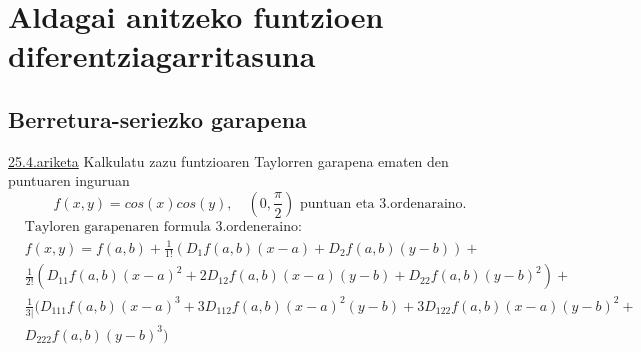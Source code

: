\chapter{Aldagai anitzeko funtzioen diferentziagarritasuna}
\section{Berretura-seriezko garapena}
\underline{25.4.ariketa} Kalkulatu zazu funtzioaren Taylorren garapena ematen den puntuaren inguruan
\begin{equation*}
    f(x,y)=cos(x)cos(y), \quad (0,\frac{\pi}{2}) \text{ puntuan eta 3.ordenaraino.}
\end{equation*}
\begin{equation*}
\begin{split}
    &\text{Tayloren garapenaren formula 3.ordeneraino:}\\
    &f(x,y)=f(a,b)+\frac{1}{1!}(D_1f(a,b)(x-a)+D_2f(a,b)(y-b))+\\
    &\frac{1}{2!}(D_{11}f(a,b)(x-a)^2 +2 D_{12}f(a,b)(x-a)(y-b)+D_{22}f(a,b)(y-b)^2)+\\
    &\frac{1}{3|}(D_{111}f(a,b)(x-a)^3+3D_{112}f(a,b)(x-a)^2(y-b)+3D_{122}f(a,b)(x-a)(y-b)^2+\\
    &D_{222}f(a,b)(y-b)^3)\\
\end{split}
\end{equation*}

